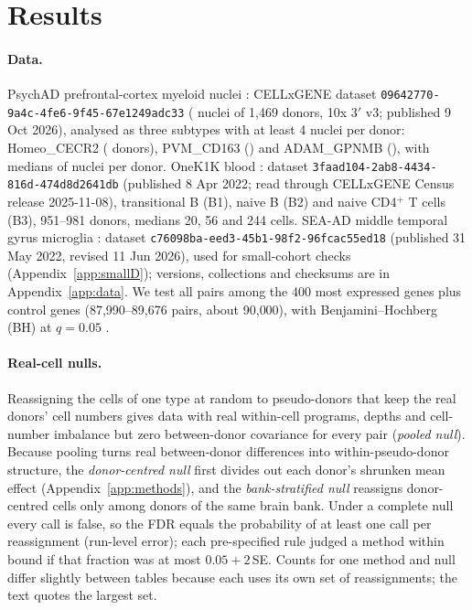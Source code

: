 \section{Results}\label{sec:results}

\paragraph{Data.} PsychAD prefrontal-cortex myeloid nuclei \citep{Lee2026}: CELLxGENE dataset \nolinkurl{09642770-9a4c-4fe6-9f45-67e1249adc33} (\NnucPsy{} nuclei of 1{,}469 donors, 10x 3$'$ v3; published 9 Oct 2026), analysed as three subtypes with at least 4 nuclei per donor: Homeo\_CECR2 (\DPone{} donors), PVM\_CD163 (\DPtwo) and ADAM\_GPNMB (\DPthree), with medians of \NdMedRange{} nuclei per donor. OneK1K blood \citep{Yazar2022}: dataset \nolinkurl{3faad104-2ab8-4434-816d-474d8d2641db} (published 8 Apr 2022; read through CELLxGENE Census release 2025-11-08), transitional B (B1), naive B (B2) and naive CD4$^+$ T cells (B3), 951--981 donors, medians 20, 56 and 244 cells. SEA-AD middle temporal gyrus microglia \citep{Gabitto2024SEAAD}: dataset \nolinkurl{c76098ba-eed3-45b1-98f2-96fcac55ed18} (published 31 May 2022, revised 11 Jun 2026), used for small-cohort checks (Appendix~\ref{app:smallD}); versions, collections and checksums are in Appendix~\ref{app:data}. We test all pairs among the 400 most expressed genes plus control genes (87{,}990--89{,}676 pairs, about 90{,}000), with Benjamini--Hochberg (BH) at $q=0.05$ \citep{BenjaminiHochberg1995}.

\paragraph{Real-cell nulls.} Reassigning the cells of one type at random to pseudo-donors that keep the real donors' cell numbers gives data with real within-cell programs, depths and cell-number imbalance but zero between-donor covariance for every pair (\emph{pooled null}). Because pooling turns real between-donor differences into within-pseudo-donor structure, the \emph{donor-centred null} first divides out each donor's shrunken mean effect (Appendix~\ref{app:methods}), and the \emph{bank-stratified null} reassigns donor-centred cells only among donors of the same brain bank. Under a complete null every call is false, so the FDR equals the probability of at least one call per reassignment (run-level error); each pre-specified rule judged a method within bound if that fraction was at most $0.05+2$\,SE. Counts for one method and null differ slightly between tables because each uses its own set of reassignments; the text quotes the largest set.

